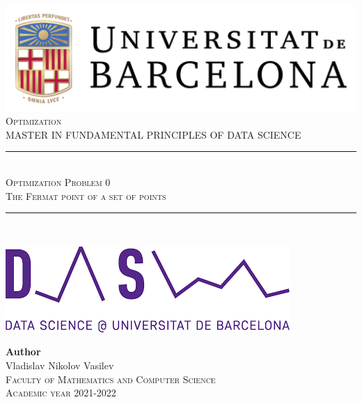 \documentclass[11pt,a4paper]{article}
\newcommand{\subject}{Optimization}
\newcommand{\autor}{Vladislav Nikolov Vasilev}
\newcommand{\titulo}{Optimization Problem 0}
\newcommand{\subtitulo}{The Fermat point of a set of points}
\newcommand{\masters}{Master in Fundamental Principles of Data Science}
\begin{document}

\begin{titlepage}
  \begin{minipage}{\textwidth}
    \centering
    \includegraphics[scale=0.25]{img/ub-logo}\\[2cm]
    
    \textsc{\Large \subject\\[0.5cm]}
    \textsc{\uppercase\expandafter{\masters}}\\[1.5cm]
    
    \noindent\rule[-1ex]{\textwidth}{1pt}\\[1.5ex]
    \textsc{{\Huge \titulo\\[0.5ex]}}
    \textsc{{\Large \subtitulo\\}}
    \noindent\rule[-1ex]{\textwidth}{2pt}\\[3.5ex]
  \end{minipage}
  
  \vspace{2cm}
  
  \begin{minipage}{\textwidth}
    \centering
    
    \includegraphics[scale=0.4]{img/ub-ds-logo}
    \vspace{2cm}
    
    \textbf{Author}\\ {\autor{}}\\[2.5ex]
    \textsc{Faculty of Mathematics and Computer Science}\\
    \vspace{1em}
    \textsc{Academic year 2021-2022}
  \end{minipage}
\end{titlepage}
\end{document}
